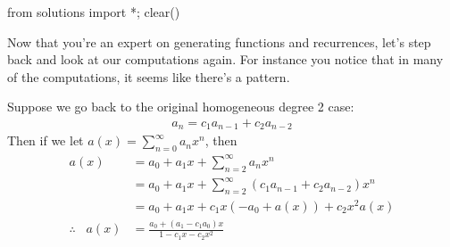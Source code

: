 \begin{python0}
from solutions import *; clear() 
\end{python0}

Now that you're an expert on generating functions and 
recurrences, let's step back and look at our computations again.
For instance you notice that in many of the computations,
it seems like there's a pattern.

Suppose we go back to the original homogeneous degree 2 case:
\begin{align*}
a_n = c_1 a_{n-1} + c_2 a_{n-2}
\end{align*}
Then if we let $a(x) = \sum_{n=0}^\infty a_n x^n$, then
\begin{align*}
a(x) 
&= a_0 + a_1x + \sum_{n=2}^\infty a_n x^n \\
&= a_0 + a_1x + \sum_{n=2}^\infty (c_1 a_{n-1} + c_2 a_{n-2}) x^n \\
&= a_0 + a_1x + c_1 x(-a_0 + a(x)) + c_2 x^2 a(x) \\
\therefore\,\,\,\,\,
a(x) &= 
\frac{a_0 + (a_1 - c_1a_0)x}{1 - c_1x - c_2x^2}
\end{align*}

